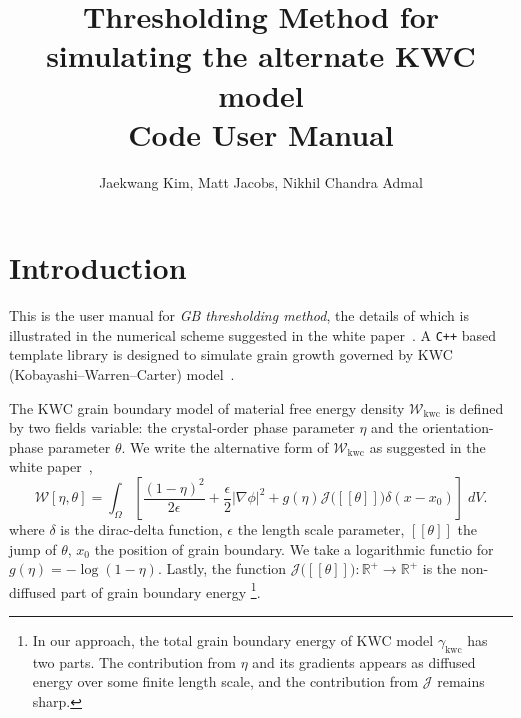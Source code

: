 \documentclass[11pt]{article}
\begin{document}
\title{Thresholding Method for simulating the alternate KWC model\\ Code User Manual}
\author{Jaekwang Kim, Matt Jacobs, Nikhil Chandra Admal} 

\maketitle 
\sectionfont{\fontsize{14}{14}\selectfont}

\normalsize

\section{Introduction}

This is the user manual for \textit{GB thresholding method}, 
the details of which is illustrated in the numerical scheme suggested in the white paper~\cite{Jkim:2020}.
A \texttt{C++} based template library is designed to simulate grain growth governed by   
KWC (Kobayashi--Warren--Carter) model~\cite{KWC:1998,KWC:2001,KWC:2003}.

The KWC grain boundary model of material free energy density $\mathcal{W}_{\mathrm{kwc}}$  
is defined by two fields variable: the crystal-order phase parameter $\eta$ 
and the orientation-phase parameter $\theta$. 
We write the alternative form of $\mathcal{W}_{\mathrm{kwc}}$ as suggested in the
white paper~\cite{Jkim:2020},
\begin{equation}
\mathcal{W}[\eta,\theta] = \int_{\Omega}
\left[ \frac{(1-\eta)^2}{2 \epsilon} + \frac{\epsilon}{2}|\nabla \phi|^2
+g(\eta) \mathcal{J}\big( [\![\theta ]\!]\big) \delta(x-x_0) 
\right]\; dV.
\label{eqn:alternateKWC}
\end{equation}
where $\delta$ is the dirac-delta function, 
$\epsilon$ the length scale parameter,
$[\![\theta]\!]$ the jump of $\theta$, 
$x_0$ the position of grain boundary.
We take a logarithmic functio for $g(\eta)=-\log{(1-\eta)}$. 
Lastly, the function $\mathcal{J}\big( [\![\theta ]\!]\big): \mathbb{R}^{+} \to \mathbb{R}^{+}$
is the non-diffused part of grain boundary energy
\footnote{In our approach, the total grain boundary energy 
of KWC model $\gamma_{\mathrm{kwc}}$ has two parts. 
The contribution from $\eta$ and its gradients appears as diffused 
energy over some finite length scale, and the contribution from $\mathcal{J}$
remains sharp.
}.
\end{document}
